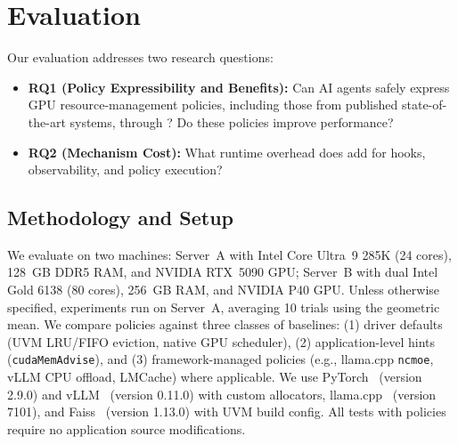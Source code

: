 \section{Evaluation}
\label{sec:eval}

Our evaluation addresses two research questions:

\begin{itemize}[leftmargin=*]
  \item \textbf{RQ1 (Policy Expressibility and Benefits):} Can AI agents safely express GPU resource-management policies, including those from published state-of-the-art systems, through \sys{}? Do these policies improve performance?
  \item \textbf{RQ2 (Mechanism Cost):} What runtime overhead does \sys{} add for hooks, observability, and policy execution?
\end{itemize}

\subsection{Methodology and Setup}

We evaluate \sys on two machines: Server~A with Intel Core Ultra~9 285K (24 cores), 128~GB DDR5 RAM, and NVIDIA RTX~5090 GPU; Server~B with dual Intel Gold 6138 (80 cores), 256~GB RAM, and NVIDIA P40 GPU.
Unless otherwise specified, experiments run on Server~A, averaging 10 trials using the geometric mean.
We compare \sys{} policies against three classes of baselines: (1) driver defaults (UVM LRU/FIFO eviction, native GPU scheduler), (2) application-level hints (\texttt{cudaMemAdvise}), and (3) framework-managed policies (e.g., llama.cpp \texttt{ncmoe}, vLLM CPU offload, LMCache) where applicable.
We use PyTorch~\cite{paszke2019pytorch} (version 2.9.0) and vLLM~\cite{kwon2023efficient} (version 0.11.0) with custom allocators, llama.cpp~\cite{llamacpp} (version 7101), and Faiss~\cite{johnson2021faiss} (version 1.13.0) with UVM build config.
All tests with \sys policies require no application source modifications.

